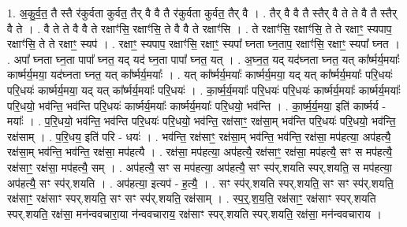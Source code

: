 \documentclass[17pt]{extarticle}
\begin{document}
1. अ॒कु॒र्व॒त॒ तै स्तै र॑कुर्वता कुर्वत॒ तैर् वै वै तै र॑कुर्वता कुर्वत॒ तैर् वै । . तैर् वै वै तै स्तैर् वै ते ते वै तै स्तैर् वै ते । . वै ते ते वै वै ते रक्षाꣳ॑सि॒ रक्षाꣳ॑सि॒ ते वै वै ते रक्षाꣳ॑सि । . ते रक्षाꣳ॑सि॒ रक्षाꣳ॑सि॒ ते ते रक्षाꣳ॒॒ स्यपाप॒ रक्षाꣳ॑सि॒ ते ते रक्षाꣳ॒॒ स्यप॑ । . रक्षाꣳ॒॒ स्यपाप॒ रक्षाꣳ॑सि॒ रक्षाꣳ॒॒ स्यपा᳚ घ्नता घ्न॒ताप॒ रक्षाꣳ॑सि॒ रक्षाꣳ॒॒ स्यपा᳚ घ्नत । . अपा᳚ घ्नता घ्न॒ता पापा᳚ घ्नत॒ यद् यद॑ घ्न॒ता पापा᳚ घ्नत॒ यत् । . अ॒घ्न॒त॒ यद् यद॑घ्नता घ्नत॒ यत् का᳚र्ष्मर्य॒मयाः᳚ कार्ष्मर्य॒मया॒ यद॑घ्नता घ्नत॒ यत् 
का᳚र्ष्मर्य॒मयाः᳚ । . यत् का᳚र्ष्मर्य॒मयाः᳚ कार्ष्मर्य॒मया॒ यद् यत् का᳚र्ष्मर्य॒मयाः᳚ परि॒धयः॑ परि॒धयः॑ कार्ष्मर्य॒मया॒ यद् यत् का᳚र्ष्मर्य॒मयाः᳚ परि॒धयः॑ । . का॒र्ष्म॒र्य॒मयाः᳚ परि॒धयः॑ परि॒धयः॑ कार्ष्मर्य॒मयाः᳚ कार्ष्मर्य॒मयाः᳚ परि॒धयो॒ भव॑न्ति॒ भव॑न्ति परि॒धयः॑ कार्ष्मर्य॒मयाः᳚ कार्ष्मर्य॒मयाः᳚ परि॒धयो॒ भव॑न्ति । . का॒र्ष्म॒र्य॒मया॒ इति॑ कार्ष्मर्य - मयाः᳚ । . प॒रि॒धयो॒ भव॑न्ति॒ भव॑न्ति परि॒धयः॑ परि॒धयो॒ भव॑न्ति॒ रक्ष॑साꣳ॒॒ रक्ष॑सा॒म् भव॑न्ति परि॒धयः॑ परि॒धयो॒ भव॑न्ति॒ रक्ष॑साम् । . प॒रि॒धय॒ इति॑ परि - धयः॑ । . भव॑न्ति॒ रक्ष॑साꣳ॒॒ रक्ष॑सा॒म् भव॑न्ति॒ भव॑न्ति॒ रक्ष॑सा॒ मप॑हत्या॒ अप॑हत्यै॒ रक्ष॑सा॒म् भव॑न्ति॒ भव॑न्ति॒ रक्ष॑सा॒ मप॑हत्यै । . रक्ष॑सा॒ मप॑हत्या॒ अप॑हत्यै॒ रक्ष॑साꣳ॒॒ रक्ष॑सा॒ मप॑हत्यै॒ सꣳ स मप॑हत्यै॒ रक्ष॑साꣳ॒॒ रक्ष॑सा॒ मप॑हत्यै॒ सम् । . अप॑हत्यै॒ सꣳ स मप॑हत्या॒ अप॑हत्यै॒ सꣳ स्प॑र्.शयति स्पर्.शयति॒ स मप॑हत्या॒ अप॑हत्यै॒ सꣳ स्प॑र्.शयति । . अप॑हत्या॒ इत्यप॑ - ह॒त्यै॒ । . सꣳ स्प॑र्.शयति स्पर्.शयति॒ सꣳ सꣳ स्प॑र्.शयति॒ रक्ष॑साꣳ॒॒ रक्ष॑साꣳ स्पर्.शयति॒ सꣳ सꣳ स्प॑र्.शयति॒ रक्ष॑साम् । . स्प॒र्॒.श॒य॒ति॒ रक्ष॑साꣳ॒॒ रक्ष॑साꣳ स्पर्.शयति स्पर्.शयति॒ रक्ष॑सा॒ मन॑न्ववचारा॒या न॑न्ववचाराय॒ रक्ष॑साꣳ स्पर्.शयति स्पर्.शयति॒ रक्ष॑सा॒ मन॑न्ववचाराय । \newline
\end{document}
